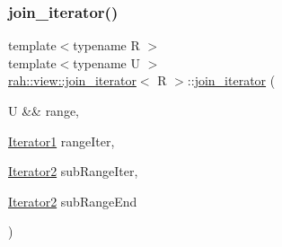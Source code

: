 \mbox{\label{structrah_1_1view_1_1join__iterator_a5a30ddd6e3809e32be7d6dc723c4afe5}} 
\subsubsection{\texorpdfstring{join\_iterator()}{join\_iterator()}\hspace{0.1cm}{\footnotesize\ttfamily [3/4]}}
{\footnotesize\ttfamily template$<$typename R $>$ \\
template$<$typename U $>$ \\
\mbox{\hyperlink{structrah_1_1view_1_1join__iterator}{rah\+::view\+::join\+\_\+iterator}}$<$ R $>$\+::\mbox{\hyperlink{structrah_1_1view_1_1join__iterator}{join\+\_\+iterator}} (\begin{DoxyParamCaption}\item[{U \&\&}]{range,  }\item[{\mbox{\hyperlink{structrah_1_1view_1_1join__iterator_a8b71c6f25eee2915e2a8afc6e024196d}{Iterator1}}}]{range\+Iter,  }\item[{\mbox{\hyperlink{structrah_1_1view_1_1join__iterator_ae03a066174f3422c70d0e3c22e68d9f7}{Iterator2}}}]{sub\+Range\+Iter,  }\item[{\mbox{\hyperlink{structrah_1_1view_1_1join__iterator_ae03a066174f3422c70d0e3c22e68d9f7}{Iterator2}}}]{sub\+Range\+End }\end{DoxyParamCaption})\hspace{0.3cm}{\ttfamily [inline]}}

\mbox{\label{structrah_1_1view_1_1join__iterator_a2ba7e5d1fd1ea1e786ca894fe96ffeb4}} 
